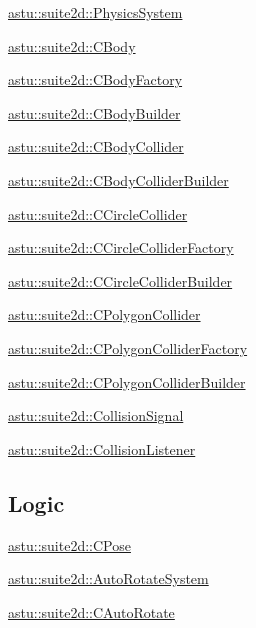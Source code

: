 \begin{DoxyItemize}
\item \hyperlink{classastu_1_1suite2d_1_1PhysicsSystem}{astu\+::suite2d\+::\+Physics\+System}
\item \hyperlink{classastu_1_1suite2d_1_1CBody}{astu\+::suite2d\+::\+C\+Body}
\item \hyperlink{classastu_1_1suite2d_1_1CBodyFactory}{astu\+::suite2d\+::\+C\+Body\+Factory}
\item \hyperlink{classastu_1_1suite2d_1_1CBodyBuilder}{astu\+::suite2d\+::\+C\+Body\+Builder}
\item \hyperlink{classastu_1_1suite2d_1_1CBodyCollider}{astu\+::suite2d\+::\+C\+Body\+Collider}
\item \hyperlink{classastu_1_1suite2d_1_1CBodyColliderBuilder}{astu\+::suite2d\+::\+C\+Body\+Collider\+Builder}
\item \hyperlink{classastu_1_1suite2d_1_1CCircleCollider}{astu\+::suite2d\+::\+C\+Circle\+Collider}
\item \hyperlink{classastu_1_1suite2d_1_1CCircleColliderFactory}{astu\+::suite2d\+::\+C\+Circle\+Collider\+Factory}
\item \hyperlink{classastu_1_1suite2d_1_1CCircleColliderBuilder}{astu\+::suite2d\+::\+C\+Circle\+Collider\+Builder}
\item \hyperlink{classastu_1_1suite2d_1_1CPolygonCollider}{astu\+::suite2d\+::\+C\+Polygon\+Collider}
\item \hyperlink{classastu_1_1suite2d_1_1CPolygonColliderFactory}{astu\+::suite2d\+::\+C\+Polygon\+Collider\+Factory}
\item \hyperlink{classastu_1_1suite2d_1_1CPolygonColliderBuilder}{astu\+::suite2d\+::\+C\+Polygon\+Collider\+Builder}
\item \hyperlink{classastu_1_1suite2d_1_1CollisionSignal}{astu\+::suite2d\+::\+Collision\+Signal}
\item \hyperlink{classastu_1_1suite2d_1_1CollisionListener}{astu\+::suite2d\+::\+Collision\+Listener}
\end{DoxyItemize}\hypertarget{group__suite2d__group_logic_sect}{}\subsection{Logic}\label{group__suite2d__group_logic_sect}

\begin{DoxyItemize}
\item \hyperlink{classastu_1_1suite2d_1_1CPose}{astu\+::suite2d\+::\+C\+Pose}
\item \hyperlink{classastu_1_1suite2d_1_1AutoRotateSystem}{astu\+::suite2d\+::\+Auto\+Rotate\+System}
\item \hyperlink{classastu_1_1suite2d_1_1CAutoRotate}{astu\+::suite2d\+::\+C\+Auto\+Rotate} 
\end{DoxyItemize}

